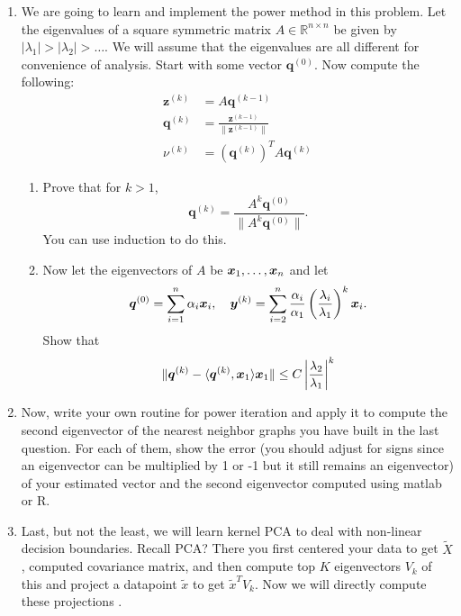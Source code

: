 \documentclass[11pt]{article}
\begin{document}
\begin{enumerate}
\newcommand{\by}{\boldsymbol{y}}
\newcommand{\bz}{\boldsymbol{z}}
\newcommand{\bq}{\boldsymbol{q}}
\newcommand{\bo}{\boldsymbol{1}}

\item We are going to learn and implement the power method in this problem. Let the eigenvalues of a square symmetric matrix $A\in \mathbb{R}^{n\times n}$ be given by $|\lambda_1|>|\lambda_2| > \dots$. We will assume that the eigenvalues are all different for convenience of analysis. Start with some vector $\bq^{(0)}$. Now compute the following:
\begin{align}
\bz^{(k)}&=A\bq^{(k-1)}\\
\bq^{(k)}&=\frac{\bz^{(k-1)}}{\|\bz^{(k-1)}\|}\\
\nu^{(k)}&=(\bq^{(k)})^TA\bq^{(k)}
\end{align}
\begin{enumerate}
\item Prove that for $k>1$, $$\bq^{(k)}=\frac{A^k \bq^{(0)}}{\|A^k \bq^{(0)}\|}.$$ You can use induction to do this.
\item Now let the eigenvectors of $A$ be $\boldsymbol{x}_1,\dots,\boldsymbol{x}_n$ and let $$\bq^{(0)}=\sum_{i=1}^n\alpha_i\bx_i,\ \ \ \by^{(k)}=\sum_{i=2}^n \frac{\alpha_i}{\alpha_1} \left(\frac{\lambda_i}{\lambda_1}\right)^k\bx_i.$$
Show that \begin{align*}
\|\bq^{(k)}-\langle\bq^{(k)},\bx_1\rangle \bx_1\|\leq C\left|\frac{\lambda_2}{\lambda_1}\right|^k
\end{align*}
\end{enumerate}
\item Now, write your own routine for power iteration and apply it to compute the second eigenvector of the nearest neighbor graphs you have built in the last question. For each of them, show the error (you should adjust for signs since an eigenvector can be multiplied by 1 or -1 but it still remains an eigenvector) of your estimated vector and the second eigenvector computed using matlab or R.
\item Last, but not the least, we will learn kernel PCA to deal with non-linear decision boundaries.
Recall PCA? There you first centered your data to get $\tilde{X}$, computed covariance matrix, and then compute top $K$ eigenvectors $V_k$ of this and project a datapoint $\tilde{x}$ to get $\tilde{x}^TV_k$. Now we will directly compute these projections .
\begin{enumerate}

\end{enumerate}
\end{enumerate}
\end{document}
